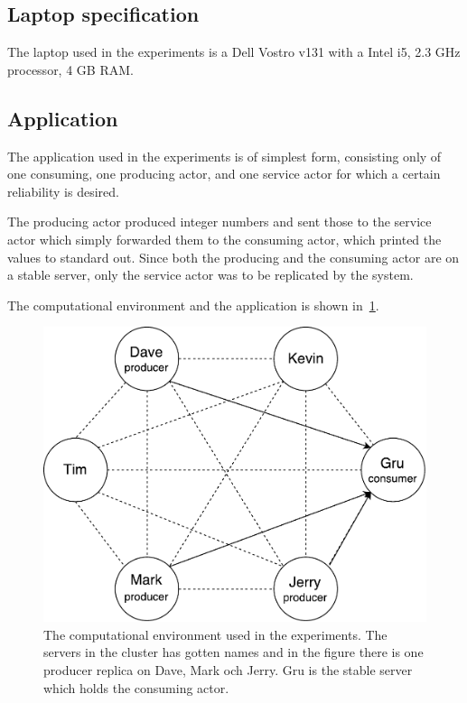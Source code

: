 \documentclass{cslthse-msc}
\begin{document}
\subsection{Laptop specification} \label{sec:laptop_spec}
The laptop used in the experiments is a Dell Vostro v131 with a Intel i5, 2.3 GHz processor, 4 GB RAM. 

\subsection{Application} \label{sec:eval_application}
The application used in the experiments is of simplest form, consisting only of one consuming, one producing actor, and one service actor for which a certain reliability is desired. 

The producing actor produced integer numbers and sent those to the  service actor which simply forwarded them to the consuming actor, which printed the values to standard out. Since both the producing and the consuming actor are on a stable server, only the service actor was to be replicated by the system.

The computational environment and the application is shown in~\cref{fig:evaluation_application}.

\begin{figure}[!hbt]
\centering
\includegraphics[scale=0.5]{images/evaluation_application.pdf} 
\caption{The computational environment used in the experiments. The servers in the cluster has gotten names and in the figure there is one producer replica on Dave, Mark och Jerry. Gru is the stable server which holds the consuming actor.} \label{fig:evaluation_application}
\end{figure}
\end{document}
